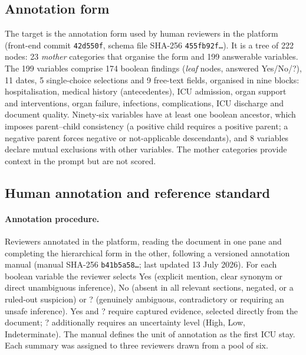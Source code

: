 \subsection{Annotation form}\label{sec:form}

The target is the annotation form used by human reviewers in the platform (front-end commit
\texttt{42d550f}, schema file SHA-256 \texttt{455fb92f\ldots}). It is a tree of 222 nodes: 23
\emph{mother} categories that organise the form and 199 answerable variables. The 199 variables comprise
174 boolean findings (\emph{leaf} nodes, answered Yes/No/?), 11 dates, 5 single-choice selections
and 9 free-text fields, organised in nine blocks: hospitalisation, medical history (antecedentes),
ICU admission, organ support and interventions, organ failure, infections, complications, ICU
discharge and document quality. Ninety-six variables have at least one boolean ancestor, which
imposes parent--child consistency (a positive child requires a positive parent; a negative parent
forces negative or not-applicable descendants), and 8 variables declare mutual exclusions with other
variables. The mother categories provide context in the prompt but are not scored.

\subsection{Human annotation and reference standard}\label{sec:reference}

\paragraph{Annotation procedure.} Reviewers annotated in the platform, reading the document in one
pane and completing the hierarchical form in the other, following a versioned annotation manual
(manual SHA-256 \texttt{b41b5a58\ldots}; last updated 13 July 2026). For each boolean variable the
reviewer selects Yes (explicit mention, clear synonym or direct unambiguous inference), No (absent in
all relevant sections, negated, or a ruled-out suspicion) or ? (genuinely ambiguous, contradictory or
requiring an unsafe inference). Yes and ? require captured evidence, selected directly from the
document; ? additionally requires an uncertainty level (High, Low, Indeterminate). The manual defines
the unit of annotation as the first ICU stay. Each summary was assigned to three reviewers drawn from
a pool of six. 

